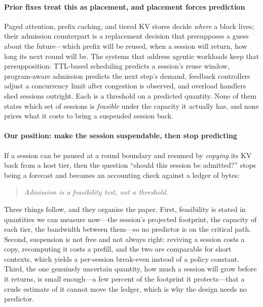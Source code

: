 \paragraph{Prior fixes treat this as placement, and placement forces prediction}
Paged attention, prefix caching, and tiered KV stores decide \emph{where} a block lives;
their admission counterpart is a replacement decision that presupposes a guess about the
future---which prefix will be reused, when a session will return, how long its next round
will be. The systems that address agentic workloads keep that presupposition: TTL-based
scheduling predicts a session's reuse window, program-aware admission predicts the next
step's demand, feedback controllers adjust a concurrency limit after congestion is
observed, and overload handlers shed sessions outright. Each is a threshold on a
predicted quantity. None of them states which set of sessions is \emph{feasible} under
the capacity it actually has, and none prices what it costs to bring a suspended session
back.

\paragraph{Our position: make the session suspendable, then stop predicting}
If a session can be paused at a round boundary and resumed by \emph{copying} its KV back
from a host tier, then the question ``should this session be admitted?'' stops being a
forecast and becomes an accounting check against a ledger of bytes:
\begin{quote}
\emph{Admission is a feasibility test, not a threshold.}
\end{quote}
Three things follow, and they organise the paper. First, feasibility is stated in
quantities we can measure now---the session's projected footprint, the capacity of each
tier, the bandwidth between them---so no predictor is on the critical path. Second,
suspension is not free and not always right: reviving a session costs a copy, recomputing
it costs a prefill, and the two are comparable for short contexts, which yields a
per-session break-even instead of a policy constant. Third, the one genuinely uncertain
quantity, how much a session will grow before it returns, is small enough---a few percent
of the footprint it protects---that a crude estimate of it cannot move the ledger, which is
why the design needs no predictor.

